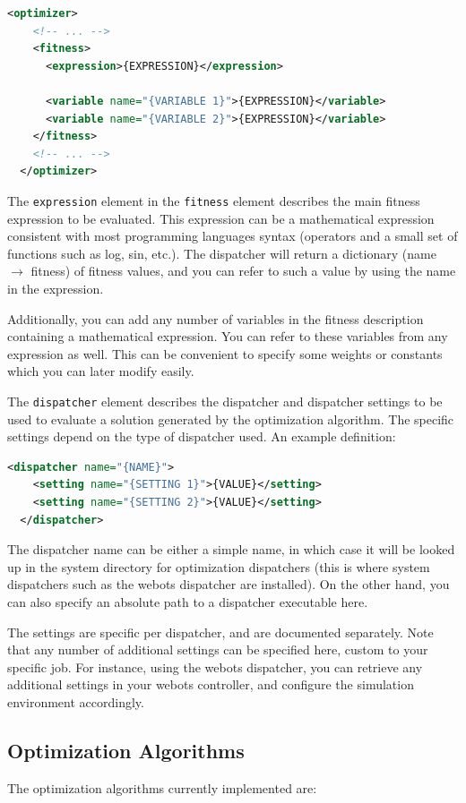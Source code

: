 \documentclass{article}
\begin{document}
\begin{lstlisting}[language=xml]
  <optimizer>
    <!-- ... -->
    <fitness>
      <expression>{EXPRESSION}</expression>

      <variable name="{VARIABLE 1}">{EXPRESSION}</variable>
      <variable name="{VARIABLE 2}">{EXPRESSION}</variable>
    </fitness>
    <!-- ... -->
  </optimizer>
\end{lstlisting}

The \verb!expression! element in the \verb!fitness! element describes the main
fitness expression to be evaluated. This expression can be a mathematical
expression consistent with most programming languages syntax (operators and
a small set of functions such as log, sin, etc.). The dispatcher will return
a dictionary (name $\rightarrow$ fitness) of fitness values, and you can refer
to such a value by using the name in the expression.

Additionally, you can add any number of variables in the fitness description
containing a mathematical expression. You can refer to these variables from
any expression as well. This can be convenient to specify some weights or
constants which you can later modify easily.

The \verb!dispatcher! element describes the dispatcher and dispatcher settings
to be used to evaluate a solution generated by the optimization algorithm. The
specific settings depend on the type of dispatcher used. An example definition:

\begin{lstlisting}[language=xml]
  <dispatcher name="{NAME}">
    <setting name="{SETTING 1}">{VALUE}</setting>
    <setting name="{SETTING 2}">{VALUE}</setting>
  </dispatcher>
\end{lstlisting}

The dispatcher name can be either a simple name, in which case it will be
looked up in the system directory for optimization dispatchers (this is where
system dispatchers such as the webots dispatcher are installed). On the other
hand, you can also specify an absolute path to a dispatcher executable here.

The settings are specific per dispatcher, and are documented separately. Note
that any number of additional settings can be specified here, custom to your
specific job. For instance, using the webots dispatcher, you can retrieve any
additional settings in your webots controller, and configure the simulation
environment accordingly.

\subsection{Optimization Algorithms}
The optimization algorithms currently implemented are:
\end{document}
